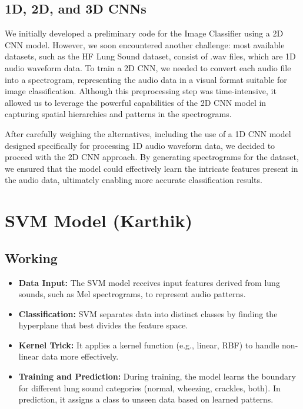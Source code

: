\documentclass[conference]{IEEEtran}
\begin{document}
\subsection{1D, 2D, and 3D CNNs}
We initially developed a preliminary code for the Image Classifier using a 2D CNN model. However, we soon encountered another challenge: most available datasets, such as the HF Lung Sound dataset, consist of .wav files, which are 1D audio waveform data. To train a 2D CNN, we needed to convert each audio file into a spectrogram, representing the audio data in a visual format suitable for image classification. Although this preprocessing step was time-intensive, it allowed us to leverage the powerful capabilities of the 2D CNN model in capturing spatial hierarchies and patterns in the spectrograms.

After carefully weighing the alternatives, including the use of a 1D CNN model designed specifically for processing 1D audio waveform data, we decided to proceed with the 2D CNN approach. By generating spectrograms for the dataset, we ensured that the model could effectively learn the intricate features present in the audio data, ultimately enabling more accurate classification results.




\section{SVM Model (Karthik)}

\subsection{Working}
\begin{itemize}
    \item \textbf{Data Input:} The SVM model receives input features derived from lung sounds, 
    such as Mel spectrograms, to represent audio patterns.
    \item \textbf{Classification:} SVM separates data into distinct classes by finding the 
    hyperplane that best divides the feature space.
    \item \textbf{Kernel Trick:} It applies a kernel function (e.g., linear, RBF) to handle 
    non-linear data more effectively.
    \item \textbf{Training and Prediction:} During training, the model learns the boundary for 
    different lung sound categories (normal, wheezing, crackles, both). In prediction, it assigns 
    a class to unseen data based on learned patterns.
\end{itemize}
\end{document}
